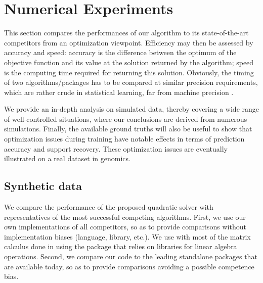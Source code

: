 \section{Numerical Experiments}\label{sec:experiments}

This section compares the performances of our algorithm to its state-of-the-art
competitors from an optimization viewpoint.  Efficiency may then be assessed by
accuracy and speed:  accuracy is the difference between the optimum of the
objective function and its value at the solution returned by the algorithm;
speed is the computing time required for returning this solution.
Obviously, the timing of two algorithms/packages has to be compared at similar
precision requirements, which are rather crude in statistical learning, far from
machine precision \citep{Bottou08}.

 We provide an in-depth analysis on simulated data, thereby covering
a wide range of well-controlled situations, where our conclusions are
derived from numerous simulations.  Finally, the available ground
truths will also be useful to show that optimization issues during
training have notable effects in terms of prediction accuracy and
support recovery.  These optimization issues are eventually illustrated
on  a real dataset in genomics.


\subsection{Synthetic data}

We compare the performance of the proposed quadratic solver with
representatives of the most successful competing algorithms.
First, we use our own implementations of all competitors, so as to provide
comparisons without implementation biases (language, library, etc.).
We use  with most of the matrix calculus done in  using
the  package \citep{2011_JSS_rcpp,armadillo} that relies
on  libraries for linear algebra operations.
Second, we compare our code to the leading standalone packages that are
available today, so as to provide comparisons avoiding a possible competence
bias.

